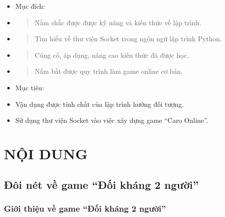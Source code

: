 \documentclass[a4paper]{article}
\begin{document}
\begin{itemize}
\item
  Mục đích:
\end{itemize}

\begin{itemize}
\item
  \begin{quote}
  Nắm chắc được được kỹ năng và kiến thức về lập trình.
  \end{quote}
\item
  \begin{quote}
  Tìm hiểu về thư viện Socket trong ngôn ngữ lập trình Python.
  \end{quote}
\item
  \begin{quote}
  Củng cố, áp dụng, nâng cao kiến thức đã được học.
  \end{quote}
\item
  \begin{quote}
  Nắm bắt được quy trình làm game online cơ bản.
  \end{quote}
\end{itemize}

\begin{itemize}
\item
  Mục tiêu:
\end{itemize}

\begin{itemize}
\item
  Vận dụng được tính chất của lập trình hướng đối tượng.
\item
  Sử dụng thư viện Socket vào việc xây dựng game ``Caro Online''.
\end{itemize}

\clearpage

\hypertarget{phux1ea7n-ii.-nux1ed9i-dung}{%
\section{NỘI DUNG}\label{phux1ea7n-ii.-nux1ed9i-dung}}

\hypertarget{ux111uxf4i-nuxe9t-vux1ec1-game-caro-online}{%
\subsection{\texorpdfstring{Đôi nét về game ``Đối kháng 2 người''
}{Đôi nét về game ``Caro Online'' }}\label{ux111uxf4i-nuxe9t-vux1ec1-game-caro-online}}

\hypertarget{giux1edbi-thiux1ec7u-vux1ec1-game-caro-online}{%
\subsubsection{Giới thiệu về game ``Đối kháng 2 người''}\label{giux1edbi-thiux1ec7u-vux1ec1-game-caro-online}}
\end{document}
